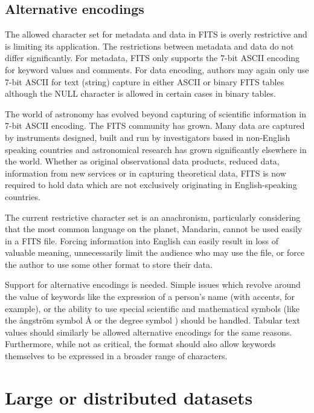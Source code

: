 \documentclass[final,authoryear,5p,times,twocolumn]{elsarticle}
\begin{document}
{{\subsection{Alternative encodings}
\label{section_char_encoding}

The allowed character set for metadata and data in FITS is overly
restrictive and is limiting its application. The restrictions between
metadata and data do not differ significantly. For metadata,
FITS only supports the 7-bit
ASCII encoding for keyword values and comments. For data encoding,
authors may again only use 7-bit ASCII for text (string) capture in
either ASCII or binary FITS tables although the NULL character is
allowed in certain cases in binary tables.


The world of astronomy has evolved beyond capturing of scientific
information in 7-bit ASCII encoding. The FITS community has grown.
Many data are captured by instruments designed, built and run by
investigators based in non-English speaking countries and astronomical
research has grown significantly elsewhere in the world. Whether as
original observational data products, reduced data, information from new
services or in capturing theoretical data, FITS is now required to hold
data which are not exclusively originating in English-speaking countries.


The current restrictive character set is an
anachronism, particularly considering that the most common language on the planet,
Mandarin, cannot be used easily in a FITS file. Forcing information
into English can easily result in loss of valuable meaning, unnecessarily
limit the audience who may use the file, or force the author to use some other
format to store their data.


Support for alternative encodings is needed.
Simple issues which revolve around the value of keywords like the
expression of a person's name (with accents, for example), or the
ability to use special scientific and mathematical symbols (like the
\r{a}ngstr\"{o}m symbol \r{A} or the degree symbol \degree) should be
handled. Tabular text values should similarly be allowed alternative
encodings for the same reasons.  Furthermore, while not as critical, the
format should also allow keywords themselves to be expressed in a broader
range of characters.


\section{Large or distributed datasets}
\label{section_poor_large_data_support}

}}
\end{document}
